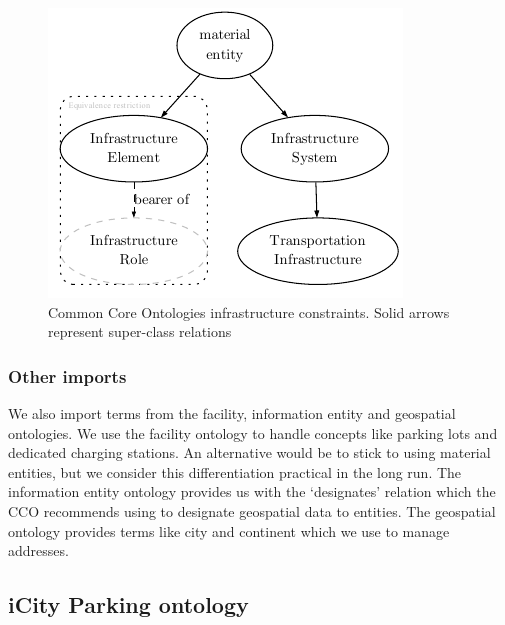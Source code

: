 \begin{figure}[h]
    \centering
    \includegraphics{images/infrastructureSystem.pdf}
    \caption{Common Core Ontologies infrastructure constraints. Solid arrows represent super-class relations}
    \label{infrastructurefigs} 
\end{figure}

\subsubsection{Other imports}

We also import terms from the facility, information entity and geospatial
ontologies. We use the facility ontology to handle concepts like parking lots
and dedicated charging stations. An alternative would be to stick to using
material entities, but we consider this differentiation practical in the long
run. The information entity ontology provides us with the `designates' relation
which the CCO recommends using to designate geospatial data to entities. The
geospatial ontology provides terms like city and continent which we use to
manage addresses.


\subsection{iCity Parking ontology}

